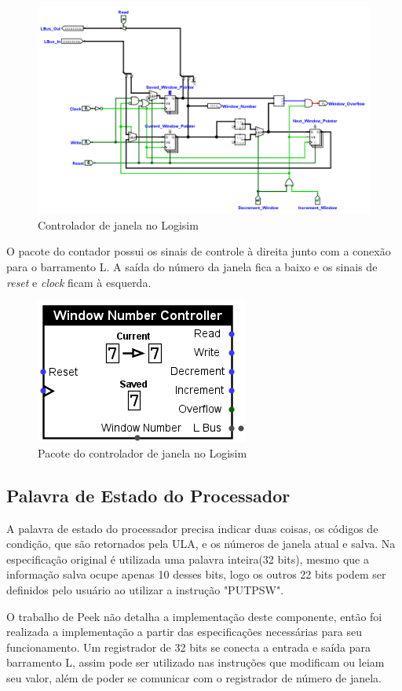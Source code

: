\documentclass[
	article,			%
	11pt,				%
	oneside,			%
	a4paper,			%
	english,			%
	brazil,				%
	sumario=tradicional
	]{abntex2}
\begin{document}
\begin{figure}[H]
    \centering
    \includegraphics[width=0.75\linewidth]{Logisim/windowNumberController.png}
    \caption{Controlador de janela no Logisim}
    \label{fig:windowController}
\end{figure}
O pacote do contador possui os sinais de controle à direita junto com a conexão para o barramento L. A saída do número da janela fica a baixo e os sinais de \textit{reset} e \textit{clock} ficam à esquerda.
\begin{figure}[H]
    \centering
    \includegraphics[width=0.25\linewidth]{Logisim/Pacote do Controlador de Janela no Logisim.png}
    \caption{Pacote do controlador de janela no Logisim}
    \label{fig:windowControllerPack}
\end{figure}
\subsection{Palavra de Estado do Processador}
A palavra de estado do processador precisa indicar duas coisas, os códigos de condição, que são retornados pela ULA, e os números de janela atual e salva. Na especificação original é utilizada uma palavra inteira(32 bits), mesmo que a informação salva ocupe apenas 10 desses bits, logo os outros 22 bits podem ser definidos pelo usuário ao utilizar a instrução "PUTPSW". 

O trabalho de Peek não detalha a implementação deste componente, então foi realizada a implementação a partir das especificações necessárias para seu funcionamento. Um registrador de 32 bits se conecta a entrada e saída para barramento L, assim pode ser utilizado nas instruções que modificam ou leiam seu valor, além de poder se comunicar com o registrador de número de janela. 
\end{document}

